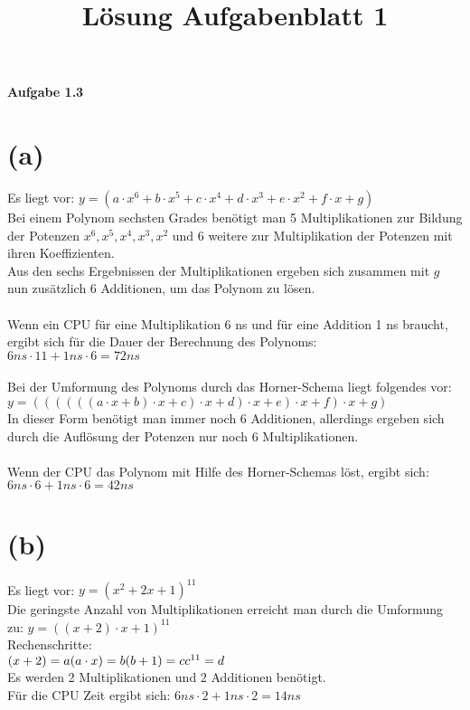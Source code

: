\documentclass[a4paper,11pt]{article}
\title{L\"osung Aufgabenblatt 1}
\begin{document}
\maketitle
\textbf{Aufgabe 1.3}\\
\section*{(a)}
Es liegt vor: $y = (a \cdot x^6 + b \cdot x^5 + c \cdot x^4 + d \cdot x^3 + e \cdot x^2 + f \cdot x + g) $\\
	Bei einem Polynom sechsten Grades benötigt man 5 Multiplikationen zur Bildung der Potenzen $x^6, x^5, x^4, x^3, x^2$ und 6 weitere zur Multiplikation der Potenzen mit ihren Koeffizienten.\\
	Aus den sechs Ergebnissen der Multiplikationen ergeben sich zusammen mit $g$ nun zus\"atzlich 6 Additionen, um das Polynom zu l\"osen.
	\paragraph{}
	Wenn ein CPU f\"ur eine Multiplikation 6 ns und f\"ur eine Addition 1 ns braucht, ergibt sich f\"ur die Dauer der Berechnung des Polynoms:\\
	$6 ns  \cdot 11 + 1 ns \cdot 6 = 72 ns$ 
	\paragraph{}
	Bei der Umformung des Polynoms durch das Horner-Schema liegt folgendes vor:\\
	$y = ((((((a \cdot x + b) \cdot x + c) \cdot x + d) \cdot x + e) \cdot x + f) \cdot x +g)$\\
	In dieser Form benötigt man immer noch 6 Additionen, allerdings ergeben sich durch die Aufl\"osung der Potenzen nur noch 6 Multiplikationen.
	\paragraph{}
	Wenn der CPU das Polynom mit Hilfe des Horner-Schemas l\"ost, ergibt sich:\\
	$6ns \cdot 6 + 1ns \cdot 6 = 42ns$
\section*{(b)}
Es liegt vor: $y = (x^2+2x+1)^{11}$\\
Die geringste Anzahl von Multiplikationen erreicht man durch die Umformung zu: $y=((x+2) \cdot x+1)^{11}$\\
Rechenschritte: \\
$(x+2)=a \\ (a\cdot x)=b \\ (b+1)=c \\ c^{11}=d$\\
Es werden 2 Multiplikationen und 2 Additionen ben\"otigt.\\
F\"ur die CPU Zeit ergibt sich: $6ns \cdot 2 + 1ns \cdot 2= 14ns$
\end{document}
